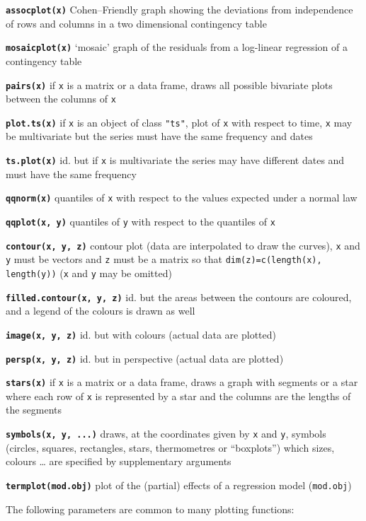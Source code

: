 \documentclass[8pt,landscape]{article}
\newcommand{\code}{\texttt}
\newcommand{\bcode}[1]{\texttt{\textbf{#1}}}
\begin{document}
\begin{multicols*}{3}
\bcode{assocplot(x)}  Cohen--Friendly graph showing the deviations  from independence of rows and columns in a two dimensional contingency table

\bcode{mosaicplot(x)}  `mosaic' graph of the residuals from a log-linear regression of a contingency table

\bcode{pairs(x)}  if \code{x} is a matrix or a data frame, draws all possible bivariate plots between the columns of \code{x}

\bcode{plot.ts(x)}  if \code{x} is an object of class \code{"ts"}, plot of \code{x} with respect to time, \code{x}  may be multivariate but the series must have the same frequency and dates

\bcode{ts.plot(x)}  id. but if \code{x} is multivariate the series may have different dates and must have the same frequency

\bcode{qqnorm(x)}  quantiles of \code{x} with respect to the values expected under a normal law

\bcode{qqplot(x, y)}  quantiles of \code{y} with respect to the quantiles of \code{x}

\bcode{contour(x, y, z)}  contour plot (data are interpolated to draw the curves), \code{x} and \code{y} must be vectors and \code{z} must be a matrix so that \code{dim(z)=c(length(x), length(y))} (\code{x} and \code{y} may be omitted)

\bcode{filled.contour(x, y, z)}  id. but the areas between the contours are coloured, and a legend of the colours is drawn as well

\bcode{image(x, y, z)}  id. but with colours (actual data are plotted)

\bcode{persp(x, y, z)}  id. but in perspective (actual data are plotted)

\bcode{stars(x)}  if \code{x} is a matrix or a data frame, draws a graph with segments or a star where each row of \code{x} is represented by a star and the columns are the lengths of the segments

\bcode{symbols(x, y, ...)}  draws, at the coordinates given by \code{x} and \code{y}, symbols (circles, squares, rectangles, stars, thermometres or ``boxplots'') which sizes, colours \ldots{} are specified by supplementary arguments

\bcode{termplot(mod.obj)}  plot of the (partial) effects of a regression model (\code{mod.obj})

\bigskip

The following parameters are common to many plotting functions:


\end{multicols*}
\end{document}
